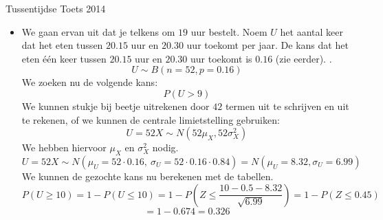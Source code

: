 \documentclass[main.tex]{subfiles}
\begin{document}
\begin{examenvraag}{Tussentijdse Toets 2014}
\begin{ex-antwoord}
\begin{itemize}
    \item 
      We gaan ervan uit dat je telkens om $19$ uur bestelt.
      Noem $U$ het aantal keer dat het eten tussen $20.15$ uur en $20.30$ uur toekomt per jaar.
      De kans dat het eten \'e\'en keer tussen $20.15$ uur en $20.30$ uur toekomt is $0.16$ (zie eerder).
      .
      \[ U \sim B(n=52, p=0.16) \]
      We zoeken nu de volgende kans:
      \[ P(U > 9) \]
      We kunnen stukje bij beetje uitrekenen door $42$ termen uit te schrijven en uit te rekenen, of we kunnen de centrale limietstelling gebruiken:
      \[ U = 52 X \sim N(52\mu_{X},52\sigma_{X}^{2}) \]
      We hebben hiervoor $\mu_{X}$ en $\sigma_{X}^{2}$ nodig.
      \[ U = 52 X \sim N(\mu_{U}= 52\cdot 0.16,\ \sigma_{U} = 52\cdot 0.16 \cdot 0.84) = N(\mu_{U}=8.32,\sigma_{U}=6.99) \]
      We kunnen de gezochte kans nu berekenen met de tabellen.
      \[ P(U \ge 10) = 1 - P(U \le 10) = 1 - P\left(Z \le \frac{10-0.5-8.32}{\sqrt{6.99}} \right) = 1 - P(Z \le 0.45) \]
      \[ = 1-0.674 = 0.326 \]
    \end{itemize}
  \end{ex-antwoord}
\end{examenvraag}
\end{document}

